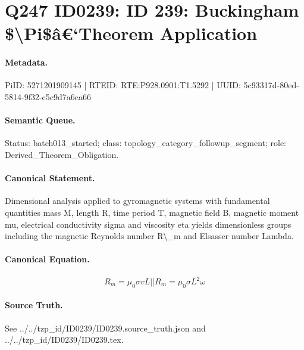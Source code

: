 \section*{Q247 ID0239: ID 239: Buckingham \$\textbackslash{}Pi\$â€‘Theorem Application}
\paragraph{Metadata.}
PiID: 5271201909145 | RTEID: RTE:P928.0901:T1.5292 | UUID: 5c93317d-80ed-5814-9f32-c5c9d7a6ca66

\paragraph{Semantic Queue.}
Status: batch013\_started; class: topology\_category\_followup\_segment; role: Derived\_Theorem\_Obligation.

\paragraph{Canonical Statement.}
Dimensional analysis applied to gyromagnetic systems with fundamental quantities mass M, length R, time period T, magnetic field B, magnetic moment mu, electrical conductivity sigma and viscosity eta yields dimensionless groups including the magnetic Reynolds number R\textbackslash{}\_m and Elsasser number Lambda.

\paragraph{Canonical Equation.}
\[
R_m=\mu_0\sigma vL || R_m=\mu_0\sigma L^2\omega
\]

\paragraph{Source Truth.}
See ../../tzp\_id/ID0239/ID0239.source\_truth.json and ../../tzp\_id/ID0239/ID0239.tex.
